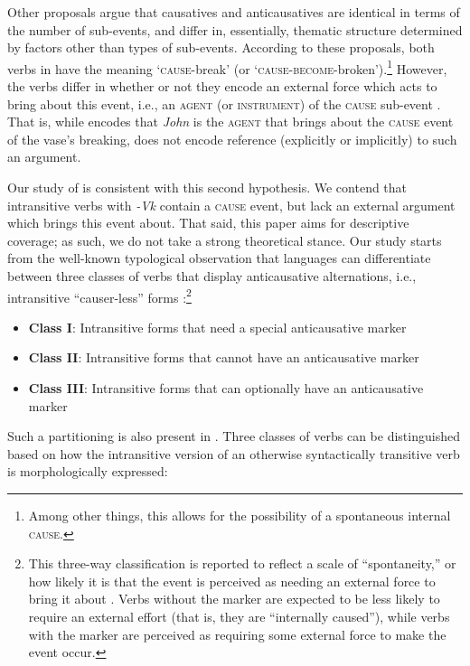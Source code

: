 \documentclass[output=paper]{langsci/lanmgscibook}
\begin{document}
Other proposals argue that causatives and anticausatives are identical in terms of the number of sub-events, and differ in, essentially, thematic structure determined by factors other than types of sub-events. According to these proposals, both verbs in  have the meaning ‘\textsc{cause}-break’ (or ‘\textsc{cause-become}-broken’).\footnote{Among other things, this allows for the possibility of a spontaneous internal \textsc{cause.}} However, the verbs differ in whether or not they encode an external force which acts to bring about this event, i.e., an \textsc{agent} (or \textsc{instrument}) of the \textsc{cause} sub-event \citep{Levin1995,Schäfer2008}. That is, while  encodes that \textit{John} is the\textsc{ agent} that brings about the \textsc{cause} event of the vase’s breaking,  does not encode reference (explicitly or implicitly) to such an argument. 

Our study of  is consistent with this second hypothesis. We contend that  intransitive verbs with \textit{-Vk} contain a \textsc{cause} event, but lack an external argument which brings this event about. That said, this paper aims for descriptive coverage; as such, we do not take a strong theoretical stance. Our study starts from the well-known typological observation that languages can differentiate between three classes of verbs that display anticausative alternations, i.e., intransitive “causer-less” forms \citep{Haspelmath1993,Schäfer2008}:\footnote{This three-way classification is reported to reflect a scale of “spontaneity,” or how likely it is that the event is perceived as needing an external force to bring it about \citep{Haspelmath1993}. Verbs without the marker are expected to be less likely to require an external effort (that is, they are “internally caused”), while verbs with the marker are perceived as requiring some external force to make the event occur.} 
\begin{itemize}
     \item \textbf{Class I}: Intransitive forms that need a special anticausative marker 
     \item \textbf{Class II}: Intransitive forms that cannot have an anticausative marker 
     \item \textbf{Class III}: Intransitive forms that can optionally have an anticausative marker 
\end{itemize}

     
Such a partitioning is also present in . Three classes of verbs can be distinguished based on how the intransitive version of an otherwise syntactically transitive verb is morphologically expressed:
\end{document}
